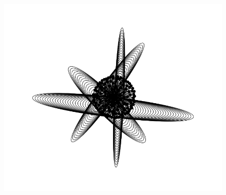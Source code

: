 \documentclass[11pt]{article}
\begin{document}
\begin{figure}[htp]
\centering
\includegraphics[scale=0.6]{1363498617__knowledge-reactor.png}
\caption{}
\label{}
\end{figure}
\end{document}
